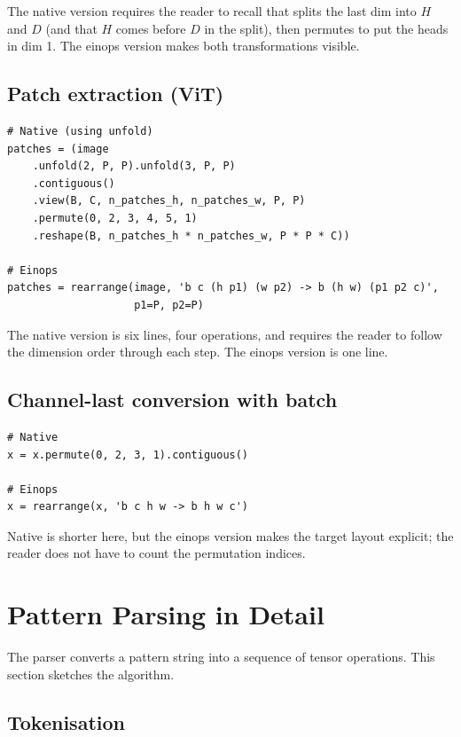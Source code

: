 The native version requires the reader to recall that
 splits the last dim into $H$ and $D$ (and
that $H$ comes before $D$ in the split), then permutes to put the
heads in dim 1. The einops version makes both transformations
visible.

\subsection{Patch extraction (ViT)}
\label{ssec:einops:patch_compare}

\begin{lstlisting}[style=lucid,language=LucidPython]
# Native (using unfold)
patches = (image
    .unfold(2, P, P).unfold(3, P, P)
    .contiguous()
    .view(B, C, n_patches_h, n_patches_w, P, P)
    .permute(0, 2, 3, 4, 5, 1)
    .reshape(B, n_patches_h * n_patches_w, P * P * C))

# Einops
patches = rearrange(image, 'b c (h p1) (w p2) -> b (h w) (p1 p2 c)',
                    p1=P, p2=P)
\end{lstlisting}

The native version is six lines, four operations, and requires
the reader to follow the dimension order through each step. The
einops version is one line.

\subsection{Channel-last conversion with batch}
\label{ssec:einops:nhwc_compare}

\begin{lstlisting}[style=lucid,language=LucidPython]
# Native
x = x.permute(0, 2, 3, 1).contiguous()

# Einops
x = rearrange(x, 'b c h w -> b h w c')
\end{lstlisting}

Native is shorter here, but the einops version makes the
target layout explicit; the reader does not have to count the
permutation indices.

\section{Pattern Parsing in Detail}
\label{sec:einops:parsing}

The parser converts a pattern string into a sequence of tensor
operations. This section sketches the algorithm.

\subsection{Tokenisation}
\label{ssec:einops:tokenisation}

